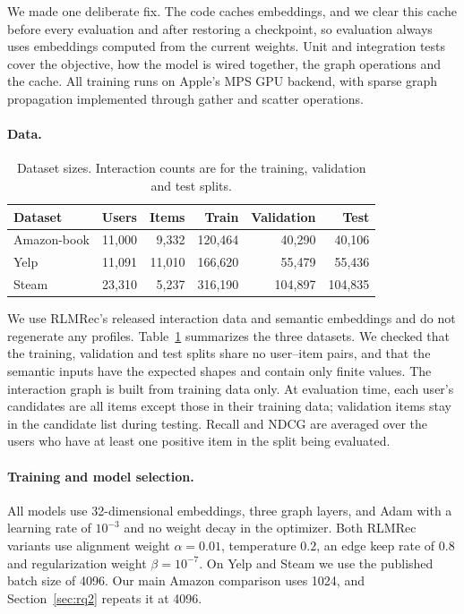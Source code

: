 \documentclass[runningheads]{llncs}
\begin{document}
We made one deliberate fix. The code caches embeddings, and we clear this
cache before every evaluation and after restoring a checkpoint, so evaluation
always uses embeddings computed from the current weights. Unit and integration
tests cover the objective, how the model is wired together, the graph
operations and the cache. All training runs on Apple's MPS GPU backend, with
sparse graph propagation implemented through gather and scatter operations.

\paragraph{Data.}
\begin{table}[t]
\caption{Dataset sizes. Interaction counts are for the training, validation
and test splits.}
\label{tab:data}\centering\small
\begin{tabular}{lrrrrr}
\toprule
Dataset & Users & Items & Train & Validation & Test\\\midrule
Amazon-book & 11,000 & 9,332 & 120,464 & 40,290 & 40,106\\
Yelp & 11,091 & 11,010 & 166,620 & 55,479 & 55,436\\
Steam & 23,310 & 5,237 & 316,190 & 104,897 & 104,835\\
\bottomrule\end{tabular}
\end{table}
We use RLMRec's released interaction data and semantic embeddings and do not
regenerate any profiles. Table~\ref{tab:data} summarizes the three datasets.
We checked that the training, validation and test splits share no user--item
pairs, and that the semantic inputs have the expected shapes and contain only
finite values. The interaction graph is built from training data only. At
evaluation time, each user's candidates are all items except those in their
training data; validation items stay in the candidate list during testing.
Recall and NDCG are averaged over the users who have at least one positive
item in the split being evaluated.

\paragraph{Training and model selection.}
All models use 32-dimensional embeddings, three graph layers, and Adam with a
learning rate of $10^{-3}$ and no weight decay in the optimizer. Both RLMRec
variants use alignment weight $\alpha=0.01$, temperature $0.2$, an edge keep
rate of $0.8$ and regularization weight $\beta=10^{-7}$. On Yelp and Steam we
use the published batch size of 4096. Our main Amazon comparison uses 1024,
and Section~\ref{sec:rq2} repeats it at 4096.
\end{document}
